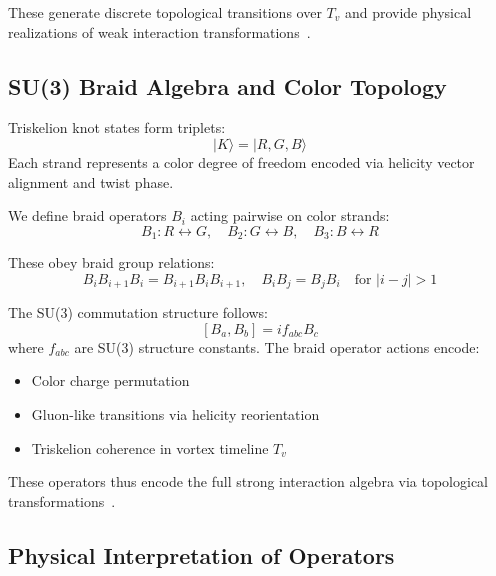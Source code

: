 \documentclass[12pt]{article}
\begin{document}
            These generate discrete topological transitions over \( T_v \) and provide physical realizations of weak interaction transformations~\cite{volovik2003universe, ranada1990topological}.
        
            \subsection{SU(3) Braid Algebra and Color Topology}
        
            Triskelion knot states form triplets:
            \[
            |K\rangle = |R, G, B\rangle
            \]
            Each strand represents a color degree of freedom encoded via helicity vector alignment and twist phase.
        
            We define braid operators \( B_i \) acting pairwise on color strands:
            \[
            B_1: R \leftrightarrow G, \quad B_2: G \leftrightarrow B, \quad B_3: B \leftrightarrow R
            \]
        
            These obey braid group relations:
            \[
            B_i B_{i+1} B_i = B_{i+1} B_i B_{i+1}, \quad B_i B_j = B_j B_i \quad \text{for } |i - j| > 1
            \]
        
            The SU(3) commutation structure follows:
            \[
            [B_a, B_b] = i f_{abc} B_c
            \]
            where \( f_{abc} \) are SU(3) structure constants. The braid operator actions encode:
            \begin{itemize}
                \item Color charge permutation
                \item Gluon-like transitions via helicity reorientation
                \item Triskelion coherence in vortex timeline \( T_v \)
            \end{itemize}
        
            These operators thus encode the full strong interaction algebra via topological transformations~\cite{moffatt1969knottedness}.
        
            \subsection{Physical Interpretation of Operators}
        
\end{document}
